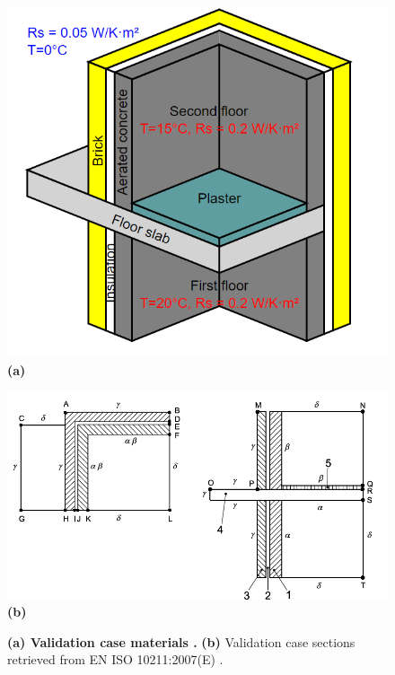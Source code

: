 \begin{figure}[H]
    \centering
    \begin{minipage}[t]{0.54\columnwidth}
        \centering
        \includegraphics[width=\linewidth]{Figures/validationcase}
        \textbf{(a)}
    \end{minipage}
    \hfill
    \begin{minipage}[t]{0.8\linewidth}
        \centering
        \includegraphics[width=\linewidth]{Figures/isodesc.png}
        \textbf{(b)}
    \end{minipage}
    
    \caption[3D Validation Materials]{\textbf{(a) Validation case materials \cite{ISO}.} \textbf{(b)}  Validation case sections retrieved from \gls{EN} ISO 10211:2007(E) \cite{ISO}.}
    \label{fig:validation-case-materials}
\end{figure}









